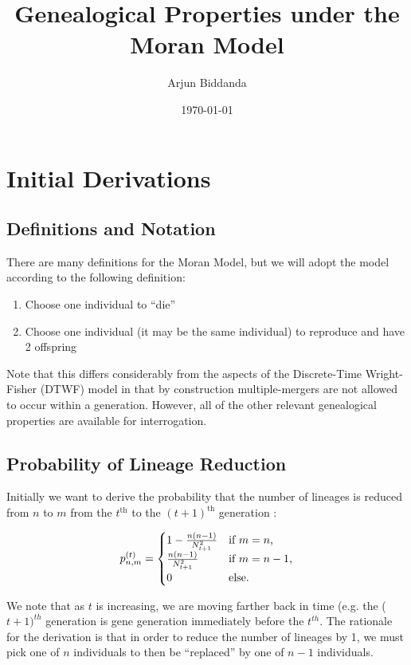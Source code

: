 \documentclass[11pt]{article}
\title{Genealogical Properties under the Moran Model}\author{Arjun Biddanda}
\date{\today}
\begin{document}
\maketitle

\section{Initial Derivations}

\subsection{Definitions and Notation}

There are many definitions for the Moran Model, but we will adopt the model according to the following definition:

\begin{enumerate}
	\item Choose one individual to ``die''
	\item Choose one individual (it may be the same individual) to reproduce and have 2 offspring
\end{enumerate}

Note that this differs considerably from the aspects of the Discrete-Time Wright-Fisher (DTWF) model in that by construction multiple-mergers are not allowed to occur within a generation. However, all of the other relevant genealogical properties are available for interrogation.

\subsection{Probability of Lineage Reduction}
Initially we want to derive the probability that the number of lineages is reduced from $n$ to $m$ from the $t^{\text{th}}$ to the $(t+1)^{\text{th}}$ generation :

\begin{equation*}
	p^{(t)}_{n,m} = 
	\begin{cases} 1 - \frac{n(n-1)}{N^2_{t+1}}  & \text{if $m = n$,}
		\\
		\frac{n(n-1)}{N^2_{t+1}} &\text{if $ m = n - 1$,}
		\\
		0 &\text{else.}
	\end{cases}
\end{equation*}

We note that as $t$ is increasing, we are moving farther back in time (e.g. the ($t+1)^{th}$ generation is gene generation immediately before the $t^{th}$. The rationale for the derivation is that in order to reduce the number of lineages by 1, we must pick one of $n$ individuals to then be ``replaced'' by one of $n-1$ individuals. 
\end{document}
